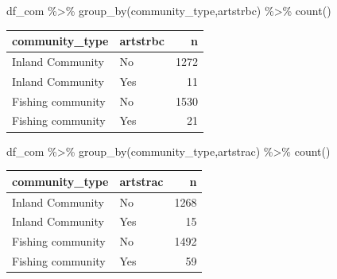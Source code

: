 \documentclass[
  letterpaper,
  DIV=11,
  numbers=noendperiod]{scrartcl}
\newenvironment{Shaded}{\begin{snugshade}}{\end{snugshade}}
\newcommand{\FunctionTok}[1]{\textcolor[rgb]{0.28,0.35,0.67}{#1}}
\newcommand{\NormalTok}[1]{\textcolor[rgb]{0.00,0.23,0.31}{#1}}
\newcommand{\SpecialCharTok}[1]{\textcolor[rgb]{0.37,0.37,0.37}{#1}}
\begin{document}
\begin{Shaded}
\begin{Highlighting}[]
\NormalTok{df\_com }\SpecialCharTok{\%\textgreater{}\%} \FunctionTok{group\_by}\NormalTok{(community\_type,artstrbc) }\SpecialCharTok{\%\textgreater{}\%} 
  \FunctionTok{count}\NormalTok{()}
\end{Highlighting}
\end{Shaded}

\begin{longtable}[]{@{}llr@{}}
\toprule\noalign{}
community\_type & artstrbc & n \\
\midrule\noalign{}
\endhead
\bottomrule\noalign{}
\endlastfoot
Inland Community & No & 1272 \\
Inland Community & Yes & 11 \\
Fishing community & No & 1530 \\
Fishing community & Yes & 21 \\
\end{longtable}

\begin{Shaded}
\begin{Highlighting}[]
\NormalTok{df\_com }\SpecialCharTok{\%\textgreater{}\%} \FunctionTok{group\_by}\NormalTok{(community\_type,artstrac) }\SpecialCharTok{\%\textgreater{}\%} 
  \FunctionTok{count}\NormalTok{()}
\end{Highlighting}
\end{Shaded}

\begin{longtable}[]{@{}llr@{}}
\toprule\noalign{}
community\_type & artstrac & n \\
\midrule\noalign{}
\endhead
\bottomrule\noalign{}
\endlastfoot
Inland Community & No & 1268 \\
Inland Community & Yes & 15 \\
Fishing community & No & 1492 \\
Fishing community & Yes & 59 \\
\end{longtable}
\end{document}
